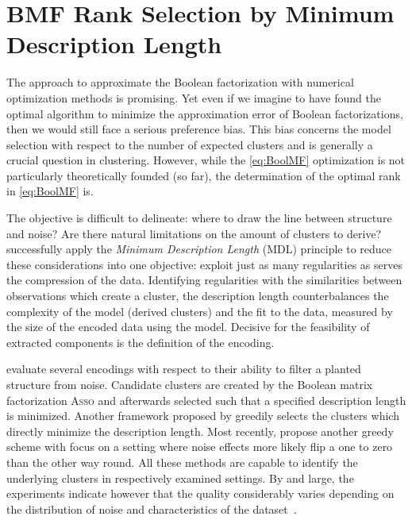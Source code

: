 \chapter{BMF Rank Selection by Minimum Description Length}
The approach to approximate the Boolean factorization with numerical optimization methods is promising. Yet even if we imagine to have found the optimal algorithm to minimize the approximation error of Boolean factorizations, then we would still face a serious preference bias. This bias concerns the model selection with respect to the number of expected clusters and is generally a crucial question in clustering. However, while the \ref{eq:BoolMF} optimization is not particularly theoretically founded (so far), the determination of the optimal rank in \ref{eq:BoolMF} is. 

The objective is difficult to delineate: where to draw the line between structure and noise? Are there natural limitations on the amount of clusters to derive? \cite{miettinen2014mdl4bmf} successfully apply the \emph{Minimum Description Length} (MDL) principle to reduce these considerations into one objective: exploit just as many regularities as serves the compression of the data. Identifying regularities with the similarities between observations which create a cluster, the description length counterbalances the complexity of the model (derived clusters) and the fit to the data, measured by the size of the encoded data using the model. Decisive for the feasibility of extracted components is the definition of the encoding. 

\cite{miettinen2014mdl4bmf} evaluate several encodings with respect to their ability to filter a planted structure from noise. Candidate clusters are created by the Boolean matrix factorization \textsc{Asso} and afterwards selected such that a specified description length is minimized. Another framework proposed by \cite{lucchese2014unifying} greedily selects the clusters which directly minimize the description length. Most recently, \cite{karaev2015getting} propose another greedy scheme with focus on a setting where noise effects more likely flip a one to zero than the other way round. All these methods are capable to identify the underlying clusters in respectively examined settings. By and large, the experiments indicate however that the quality considerably varies depending on the distribution of noise and characteristics of the dataset~\citep{miettinen2014mdl4bmf,karaev2015getting}.  


